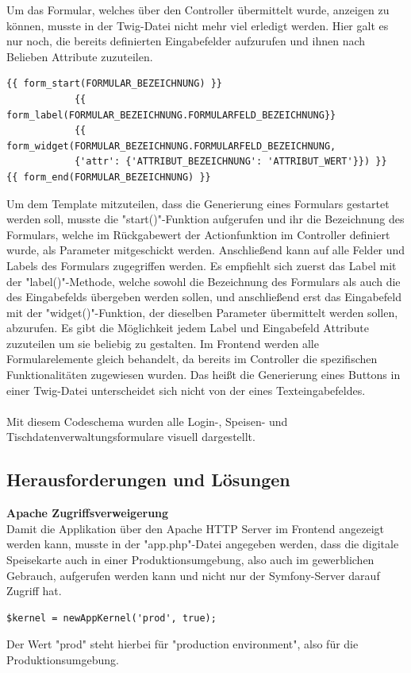 Um das Formular, welches über den Controller übermittelt wurde, anzeigen zu können, musste in der Twig-Datei nicht mehr viel erledigt werden. Hier galt es nur noch, die bereits definierten Eingabefelder aufzurufen und ihnen nach Belieben Attribute zuzuteilen.
\lstset{language = java}
  	\begin{lstlisting}
{{ form_start(FORMULAR_BEZEICHNUNG) }}
            {{ form_label(FORMULAR_BEZEICHNUNG.FORMULARFELD_BEZEICHNUNG}}
            {{ form_widget(FORMULAR_BEZEICHNUNG.FORMULARFELD_BEZEICHNUNG, 
            {'attr': {'ATTRIBUT_BEZEICHNUNG': 'ATTRIBUT_WERT'}}) }}
{{ form_end(FORMULAR_BEZEICHNUNG) }}
	\end{lstlisting}
Um dem Template mitzuteilen, dass die Generierung eines Formulars gestartet werden soll, musste die "start()"-Funktion aufgerufen und ihr die Bezeichnung des Formulars, welche im Rückgabewert der Actionfunktion im Controller definiert wurde, als Parameter mitgeschickt werden. 
Anschließend kann auf alle Felder und Labels des Formulars zugegriffen werden. Es empfiehlt sich zuerst das Label mit der "label()"-Methode, welche sowohl die Bezeichnung des Formulars als auch die des Eingabefelds übergeben werden sollen, und anschließend erst das Eingabefeld mit der "widget()"-Funktion, der dieselben Parameter übermittelt werden sollen, abzurufen. Es gibt die Möglichkeit jedem Label und Eingabefeld Attribute zuzuteilen um sie beliebig zu gestalten. Im Frontend werden alle Formularelemente gleich behandelt, da bereits im Controller die spezifischen Funktionalitäten zugewiesen wurden. Das heißt die Generierung eines Buttons in einer Twig-Datei unterscheidet sich nicht von der eines Texteingabefeldes.
\\ \\
Mit diesem Codeschema wurden alle Login-, Speisen- und Tischdatenverwaltungsformulare visuell dargestellt.

  \subsection{Herausforderungen und Lösungen}

\textbf{Apache Zugriffsverweigerung}\\ 
Damit die Applikation über den Apache HTTP Server im Frontend angezeigt werden kann, musste in der "app.php"-Datei angegeben werden, dass die digitale Speisekarte auch in einer Produktionsumgebung, also auch im gewerblichen Gebrauch, aufgerufen werden kann und nicht nur der Symfony-Server darauf Zugriff hat.
	\lstset{language=php}
  	\begin{lstlisting}
$kernel = newAppKernel('prod', true);
  	\end{lstlisting}
Der Wert "prod" steht hierbei für "production environment", also für die Produktionsumgebung.
\pagebreak

